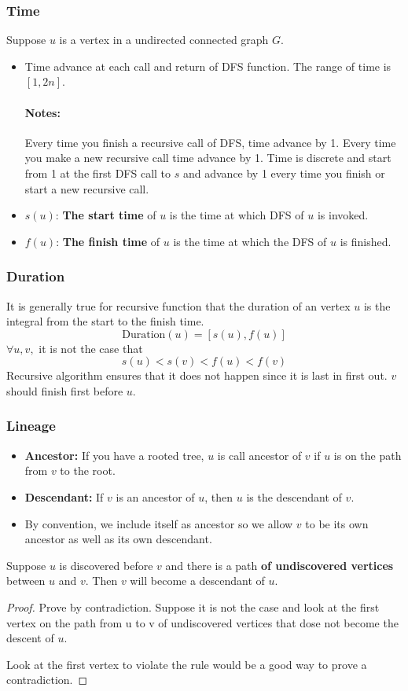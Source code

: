 \documentclass[en,hazy,blue,normal,12pt]{elegantnote}
\begin{document}
\subsubsection{Time}
Suppose $u$ is a vertex in a undirected connected graph $G$.
\begin{itemize}
\item Time advance at each call and return of DFS function. The range of time 
is $[1, 2n]$.
\paragraph{Notes:} Every time you finish a recursive call of DFS, time advance 
by 1. Every time you make a new recursive call time advance by 1. Time is 
discrete and start from 1 at the first DFS call to $s$ and advance by 1 every 
time you finish or start a new recursive call.
\item $s(u)$: \textbf{The start time} of $u$ is the time at which DFS of $u$ is 
invoked.
\item $f(u)$: \textbf{The finish time} of $u$ is the time at which the DFS of 
$u$ is finished.
\end{itemize}
\subsubsection{Duration}
It is generally true for recursive function that the duration of an vertex $u$ 
is the integral from the start to the finish time.
\[\text{Duration}(u) = [s(u), f(u)]\]
$\forall u, v,$ it is not the case that 
\[s(u) < s(v) < f(u) < f(v)\]
Recursive algorithm ensures that it does not happen since it is last in first 
out. $v$ should finish first before $u$.

\subsubsection{Lineage}
\begin{itemize}
\item \textbf{Ancestor:} If you have a rooted tree, $u$ is call ancestor of 
$v$ if $u$ is on the path from $v$ to the root. 
\item \textbf{Descendant:} If $v$ is an ancestor of $u$, then $u$ is the 
descendant of $v$.
\item By convention, we include itself as ancestor so we allow $v$ to be its 
own ancestor as well as its own descendant.
\end{itemize}
\begin{theorem}
Suppose $u$ is discovered before $v$ and there is a path \textbf{of 
undiscovered vertices} between $u$ and $v$. Then $v$ will become a descendant 
of $u$.
\end{theorem}
\begin{proof}
Prove by contradiction. Suppose it is not the case and look at the first 
vertex on the path from u to v of undiscovered vertices that dose not become 
the descent of $u$.

Look at the first vertex to violate the rule would be a good way to prove a 
contradiction.
\end{proof}
\end{document}
